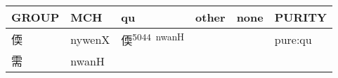 \documentclass[14pt,a4paper]{scrartcl}
\begin{document}
\begin{longtable}[c]{@{}llllll@{}}
\toprule
\begin{minipage}[b]{0.14\columnwidth}\raggedright\strut
GROUP
\strut\end{minipage} &
\begin{minipage}[b]{0.14\columnwidth}\raggedright\strut
MCH
\strut\end{minipage} &
\begin{minipage}[b]{0.14\columnwidth}\raggedright\strut
qu
\strut\end{minipage} &
\begin{minipage}[b]{0.14\columnwidth}\raggedright\strut
other
\strut\end{minipage} &
\begin{minipage}[b]{0.14\columnwidth}\raggedright\strut
none
\strut\end{minipage} &
\begin{minipage}[b]{0.14\columnwidth}\raggedright\strut
PURITY
\strut\end{minipage}\tabularnewline
\midrule
\endhead
\begin{minipage}[t]{0.14\columnwidth}\raggedright\strut
偄
\strut\end{minipage} &
\begin{minipage}[t]{0.14\columnwidth}\raggedright\strut
nywenX
\strut\end{minipage} &
\begin{minipage}[t]{0.14\columnwidth}\raggedright\strut
偄\textsuperscript{5044~nwanH}
\strut\end{minipage} &
\begin{minipage}[t]{0.14\columnwidth}\raggedright\strut
\strut\end{minipage} &
\begin{minipage}[t]{0.14\columnwidth}\raggedright\strut
\strut\end{minipage} &
\begin{minipage}[t]{0.14\columnwidth}\raggedright\strut
pure:qu
\strut\end{minipage}\tabularnewline
\begin{minipage}[t]{0.14\columnwidth}\raggedright\strut
需
\strut\end{minipage} &
\begin{minipage}[t]{0.14\columnwidth}\raggedright\strut
nwanH
\strut\end{minipage} &
\begin{minipage}[t]{0.14\columnwidth}\raggedright\strut
\strut\end{minipage} &

\end{longtable}
\end{document}
